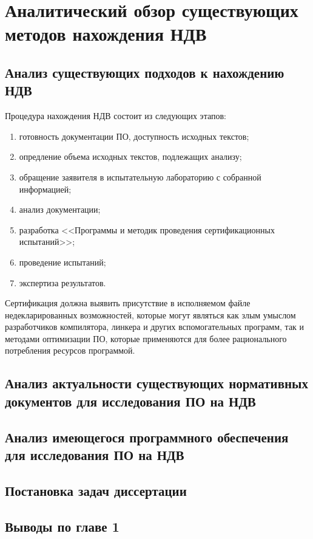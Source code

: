 \chapter{Аналитический обзор существующих методов нахождения НДВ}\label{ch:ch1}
\section{Анализ существующих подходов к нахождению НДВ}\label{sec:ch1/sec1}
Процедура нахождения НДВ состоит из следующих этапов:
\begin{enumerate}[label={\arabic*)}]
    \item готовность документации ПО, доступность исходных текстов;
    \item опредление объема исходных текстов, подлежащих анализу;
    \item обращение заявителя в испытательную лабораторию с собранной информацией;
    \item анализ документации;
    \item разработка <<Программы и методик проведения сертификационных испытаний>>;
    \item проведение испытаний;
    \item экспертиза результатов.
\end{enumerate}

Сертификация должна выявить присутствие в исполняемом файле недекларированных возможностей,
которые могут являться как злым умыслом разработчиков компилятора,
линкера и других вспомогательных программ, так и методами оптимизации ПО,
которые применяются для более рационального
потребления ресурсов программой.


\section{Анализ актуальности существующих нормативных документов для исследования ПО на НДВ}\label{sec:ch1/sec2}

\section{Анализ имеющегося программного обеспечения для исследования ПО на НДВ}\label{sec:ch1/sec3}

\section{Постановка задач диссертации}\label{sec:ch1/sec4}

\section{Выводы по главе 1}\label{sec:ch1/sec5}
